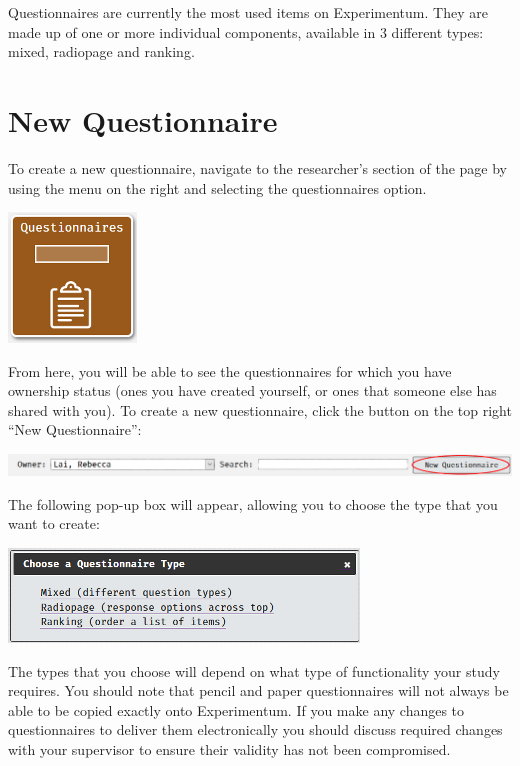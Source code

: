 \documentclass[]{book}
\begin{document}
Questionnaires are currently the most used items on Experimentum. They
are made up of one or more individual components, available in 3
different types: mixed, radiopage and ranking.

\section{New Questionnaire}\label{new-questionnaire}

To create a new questionnaire, navigate to the researcher's section of
the page by using the menu on the right and selecting the questionnaires
option.

\includegraphics{images/screenshots/questionnaire_button.png}

From here, you will be able to see the questionnaires for which you have
ownership status (ones you have created yourself, or ones that someone
else has shared with you). To create a new questionnaire, click the
button on the top right ``New Questionnaire'':

\includegraphics{images/screenshots/new_questionnaire.png}

The following pop-up box will appear, allowing you to choose the type
that you want to create:

\includegraphics{images/screenshots/questionnaire_dialogue.png}

The types that you choose will depend on what type of functionality your
study requires. You should note that pencil and paper questionnaires
will not always be able to be copied exactly onto Experimentum. If you
make any changes to questionnaires to deliver them electronically you
should discuss required changes with your supervisor to ensure their
validity has not been compromised.
\end{document}
